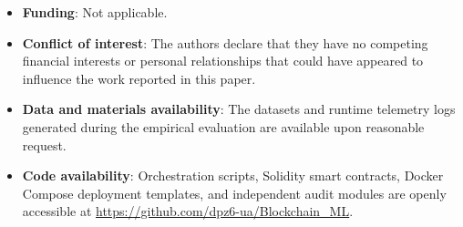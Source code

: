 \documentclass[pdflatex,sn-mathphys-num]{sn-jnl}
\theoremstyle{thmstyleone}
\theoremstyle{thmstyletwo}
\theoremstyle{thmstylethree}
\begin{document}
\begin{itemize}
    \item \textbf{Funding}: Not applicable.
    \item \textbf{Conflict of interest}: The authors declare that they have no competing financial interests or personal relationships that could have appeared to influence the work reported in this paper.
    \item \textbf{Data and materials availability}: The datasets and runtime telemetry logs generated during the empirical evaluation are available upon reasonable request.
    \item \textbf{Code availability}: Orchestration scripts, Solidity smart contracts, Docker Compose deployment templates, and independent audit modules are openly accessible at \url{https://github.com/dpz6-ua/Blockchain_ML}.
\end{itemize}

\makeatletter
\def\blocation#1{%
  \def\qmark{???}%
  \def\currloc{#1}%
  \ifx\qmark\currloc
  \else
    #1%
  \fi
}
\makeatother

\end{document}
